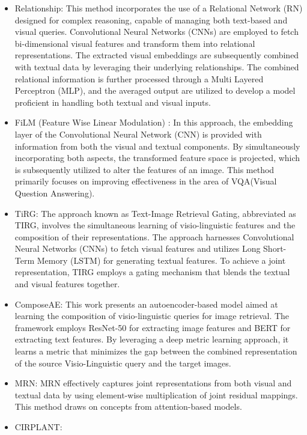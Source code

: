 \documentclass[10pt,lineno]{wlpeerj}
\begin{document}
\begin{itemize}
    \item Relationship\citep{relationship}: 
This method incorporates the use of a Relational Network (RN) designed for complex reasoning, capable of managing both text-based and visual queries. Convolutional Neural Networks (CNNs) are employed to fetch bi-dimensional visual features and transform them into relational representations. The extracted visual embeddings are subsequently combined with textual data by leveraging their underlying relationships. The combined relational information is further processed through a Multi Layered Perceptron (MLP), and the averaged output are utilized to develop a model proficient in handling both textual and visual inputs.
    \item FiLM (Feature Wise Linear Modulation) \citep{film}: In this approach, the embedding layer of the Convolutional Neural Network (CNN) is provided with information from both the visual and textual components. By simultaneously incorporating both aspects, the transformed feature space is projected, which is subsequently utilized to alter the features of an image. This method primarily focuses on improving effectiveness in the area of VQA(Visual Question Answering). %
    \item TiRG\citep{Nam}:  The approach known as Text-Image Retrieval Gating, abbreviated as TIRG, involves the simultaneous learning of visio-linguistic features and the composition of their representations. The approach harnesses Convolutional Neural Networks (CNNs) to fetch visual features and utilizes Long Short-Term Memory (LSTM) for generating textual features. To achieve a joint representation, TIRG employs a gating mechanism that blends the textual and visual features together.
    \item ComposeAE\citep{ComposeAE}:   
    This work presents an autoencoder-based model aimed at learning the composition of visio-linguistic queries for image retrieval. The framework employs ResNet-50 for extracting image features and BERT for extracting text features. By leveraging a deep metric learning approach, it learns a metric that minimizes the gap between the combined representation of the source Visio-Linguistic query and the target images.
    \item MRN\citep{MRN}: 
MRN effectively captures joint representations from both visual and textual data by using element-wise multiplication of joint residual mappings. This method draws on concepts from attention-based models.
    \item CIRPLANT\citep{CIRPLANT}: 

\end{itemize}
\end{document}
